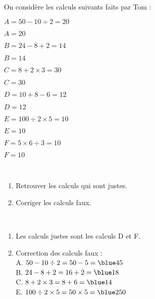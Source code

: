 \begin{exercice} %
   On considère les calculs suivants faits par Tom :
   \setlength{\columnseprule}{0pt}
   \begin{multicols}{2}
      \begin{list}{}{}
         \item $A=50-10\div2 =20$
         \item $A=20$
         \item 
         \item $B=24-8+2 =14$
         \item $B=14$
         \item 
         \item $C=8+2\times3 =30$
         \item $C=30$
         \columnbreak
         \item $D=10+8-6 =12$
         \item $D=12$
         \item 
         \item $E=100\div2\times5 =10$
         \item $E=10$
         \item 
         \item $F=5\times6\div3 =10$
         \item $F=10$
      \end{list}
   \end{multicols}
   \  \\ [-10mm]
   \begin{enumerate}
      \item Retrouver les calculs qui sont justes.
      \item Corriger les calculs faux.
   \end{enumerate}
\end{exercice}

\begin{corrige}
   \ \\ [-5mm]
   \begin{enumerate}
      \item Les calculs justes sont les calculs {\blue D} et {\blue F}. \smallskip
      \item Correction des calculs faux : \\
         A. $50-10\div2 =50-5 ={\blue 45}$ \\ [1mm]
         B. $24-8+2 =16+2 ={\blue 18}$ \\ [1mm]
         C. $8+2\times3 =8+6 ={\blue 14}$ \\ [1mm]
         E. $100\div2\times5 =50\times5 = {\blue 250}$
   \end{enumerate}
\end{corrige}